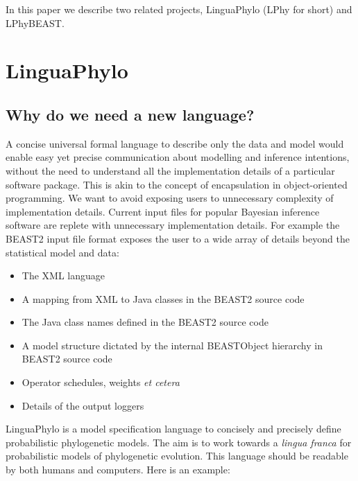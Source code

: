 \documentclass[oneside]{article}
\begin{document}
In this paper we describe two related projects, LinguaPhylo (LPhy for
short) and LPhyBEAST.  

\section{LinguaPhylo}

\subsection{Why do we need a new language?}

A concise universal formal language to describe only the data and model would enable easy yet precise communication about modelling and inference intentions, without the need to understand all the implementation details of a particular software package. This is akin to the concept of encapsulation in object-oriented programming. We want to avoid exposing users to unnecessary complexity of implementation details. 
Current input files for popular Bayesian inference software are replete with unnecessary implementation details.
For example the BEAST2 input file format exposes the user to a wide array of details beyond the statistical model and data:
\begin{itemize}
\item The XML language
\item A mapping from XML to Java classes in the BEAST2 source code
\item The Java class names defined in the BEAST2 source code
\item A model structure dictated by the internal BEASTObject hierarchy in BEAST2 source code
\item Operator schedules, weights {\it et cetera}
\item Details of the output loggers
\end{itemize}

LinguaPhylo is a model specification language to concisely and
precisely define probabilistic phylogenetic models.
The aim is to work
towards a {\it lingua franca} for probabilistic models of phylogenetic
evolution.
This language should be readable by both humans and
computers.
Here is an example: 
\end{document}
